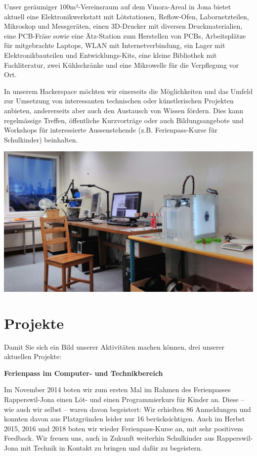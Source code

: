 \documentclass[10pt,a4paper,parskip,fleqn]{scrartcl}
\begin{document}
Unser geräumiger 100m²-Vereinsraum auf dem Vinora-Areal in Jona bietet aktuell
eine Elektronikwerkstatt mit Lötstationen, Reflow-Ofen, Labornetzteilen,
Mikroskop und Messgeräten, einen 3D-Drucker mit diversen Druckmaterialien, eine
PCB-Fräse sowie eine Ätz-Station zum Herstellen von PCBs, Arbeitsplätze für
mitgebrachte Laptops, WLAN mit Internetverbindung, ein Lager mit
Elektronikbauteilen und Entwicklungs-Kits, eine kleine Bibliothek mit
Fachliteratur, zwei Kühlschränke und eine Mikrowelle für die Verpflegung vor
Ort.

In unserem Hackerspace möchten wir einerseits die Möglichkeiten und das Umfeld
zur Umsetzung von interessanten technischen oder künstlerischen Projekten
anbieten, andererseits aber auch den Austausch von Wissen fördern. Dies kann
regelmässige Treffen, öffentliche Kurzvorträge oder auch Bildungsangebote und
Workshops für interessierte Aussenstehende (z.B. Ferienpass-Kurse für
Schulkinder) beinhalten.

\includegraphics[width=\textwidth]{img/raum.jpg}

\section{Projekte}

Damit Sie sich ein Bild unserer Aktivitäten machen können, drei unserer
aktuellen Projekte:

\textbf{Ferienpass im Computer- und Technikbereich}

Im November 2014 boten wir zum ersten Mal im Rahmen des Ferienpasses
Rapperswil-Jona einen Löt- und einen Programmierkurs für Kinder an. Diese -- wie
auch wir selbst -- waren davon begeistert: Wir erhielten 86 Anmeldungen und
konnten davon aus Platzgründen leider nur 16 berücksichtigen. Auch im Herbst
2015, 2016 und 2018 boten wir wieder Ferienpass-Kurse an, mit sehr positivem
Feedback. Wir freuen uns, auch in Zukunft weiterhin Schulkinder aus
Rapperswil-Jona mit Technik in Kontakt zu bringen und dafür zu begeistern.
\end{document}
